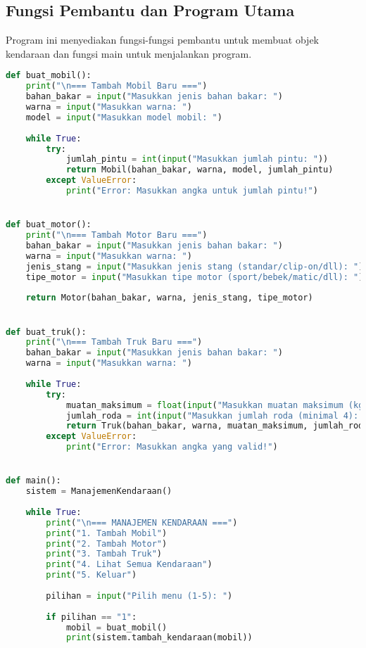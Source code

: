 \documentclass[12pt]{article}
\begin{document}
\subsection{Fungsi Pembantu dan Program Utama}
Program ini menyediakan fungsi-fungsi pembantu untuk membuat objek kendaraan dan fungsi main untuk menjalankan program.

\begin{lstlisting}[language=Python, caption=Implementasi Fungsi Pembantu dan Program Utama]
def buat_mobil():
    print("\n=== Tambah Mobil Baru ===")
    bahan_bakar = input("Masukkan jenis bahan bakar: ")
    warna = input("Masukkan warna: ")
    model = input("Masukkan model mobil: ")
    
    while True:
        try:
            jumlah_pintu = int(input("Masukkan jumlah pintu: "))
            return Mobil(bahan_bakar, warna, model, jumlah_pintu)
        except ValueError:
            print("Error: Masukkan angka untuk jumlah pintu!")


def buat_motor():
    print("\n=== Tambah Motor Baru ===")
    bahan_bakar = input("Masukkan jenis bahan bakar: ")
    warna = input("Masukkan warna: ")
    jenis_stang = input("Masukkan jenis stang (standar/clip-on/dll): ")
    tipe_motor = input("Masukkan tipe motor (sport/bebek/matic/dll): ")
    
    return Motor(bahan_bakar, warna, jenis_stang, tipe_motor)


def buat_truk():
    print("\n=== Tambah Truk Baru ===")
    bahan_bakar = input("Masukkan jenis bahan bakar: ")
    warna = input("Masukkan warna: ")
    
    while True:
        try:
            muatan_maksimum = float(input("Masukkan muatan maksimum (kg): "))
            jumlah_roda = int(input("Masukkan jumlah roda (minimal 4): "))
            return Truk(bahan_bakar, warna, muatan_maksimum, jumlah_roda)
        except ValueError:
            print("Error: Masukkan angka yang valid!")


def main():
    sistem = ManajemenKendaraan()
    
    while True:
        print("\n=== MANAJEMEN KENDARAAN ===")
        print("1. Tambah Mobil")
        print("2. Tambah Motor")
        print("3. Tambah Truk")
        print("4. Lihat Semua Kendaraan")
        print("5. Keluar")
        
        pilihan = input("Pilih menu (1-5): ")
        
        if pilihan == "1":
            mobil = buat_mobil()
            print(sistem.tambah_kendaraan(mobil))
            

\end{lstlisting}
\end{document}
